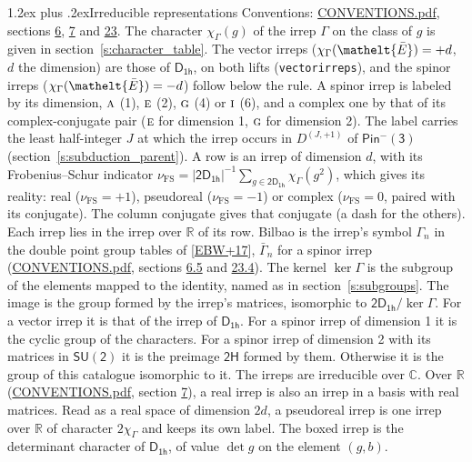 \documentclass[10pt,a4paper]{article}
\makeatletter
\renewcommand\section{\@startsection{section}{1}{\z@}{-3ex plus -1ex minus -.2ex}%
  {1.2ex plus .2ex}{\normalfont\large\sffamily\bfseries\color{parttitle}}}
\numberwithin{equation}{section}
\newcommand{\eltfont}[1]{{\let\sigma\eltsigma\mathelt{#1}}}
\newcommand{\grp}[1]{\mathsf{#1}}
\newcommand{\irr}[1]{\text{\normalfont\scshape #1}}
\newcommand{\elt}[1]{\eltfont{#1}}
\newcommand{\irrJp}[2]{D^{(#1,#2)}}
\newcommand{\irchar}[1]{\chi_{#1}}
\newcommand{\fsind}{\nu_{\mathrm{FS}}}
\newcommand{\barred}[1]{\bar{#1}}
\makeatother
\begin{document}
\section{Irreducible representations}\label{s:irreps}
Conventions: \href{../../CONVENTIONS.pdf}{CONVENTIONS.pdf}, sections \href{../../../rotation/CONVENTIONS.pdf\#conv.6}{6}, \href{../../../rotation/CONVENTIONS.pdf\#conv.7}{7} and \href{../../CONVENTIONS.pdf\#conv.23}{23}.
\leavevmode\label{n:function.character}\label{n:irrep.Gamma}The character $\irchar{\Gamma}(g)$ of the irrep $\Gamma$ on the class of $g$ is given in section~\ref{s:character_table}. \label{n:index.dimension}The vector irreps ($\irchar{\Gamma}(\elt{\barred{E}}) = +d$, $d$ the dimension) are those of \href{../../../rotation/data/pdf/D1h.pdf}{$\grp{D_{1h}}$}, on both lifts (\texttt{vectorirreps}), and the spinor irreps ($\irchar{\Gamma}(\elt{\barred{E}}) = -d$) follow below the rule. A spinor irrep is labeled by its dimension, $\irr{a}$ (1), $\irr{e}$ (2), $\irr{g}$ (4) or $\irr{i}$ (6), and a complex one by that of its complex-conjugate pair ($\irr{e}$ for dimension 1, $\irr{g}$ for dimension 2). The label carries the least half-integer $J$ at which the irrep occurs in $\irrJp{J}{+1}$ of $\grp{Pin^{-}(3)}$ (section~\ref{s:subduction_parent}).
\leavevmode\label{n:index.frobenius}\label{n:head.irrep}\label{n:head.reality}A row is an irrep of dimension $d$, with its Frobenius--Schur indicator $\fsind = |\grp{2D_{1h}}|^{-1}\allowbreak\sum_{g\in\grp{2D_{1h}}}\irchar{\Gamma}(g^2)$, which gives its reality: real ($\fsind = +1$), pseudoreal ($\fsind = -1$) or complex ($\fsind = 0$, paired with its conjugate). \label{n:head.conjugate}The column conjugate gives that conjugate (a dash for the others). \label{n:head.over.real}Each irrep lies in the irrep over $\mathbb{R}$ of its row. \label{n:head.bilbao}\label{n:irrep.alias.gamma}Bilbao is the irrep's symbol $\Gamma_n$ in the double point group tables of [\href{../../../REFERENCES.pdf\#ref.EBW+17}{EBW+17}], $\bar{\Gamma}_n$ for a spinor irrep (\href{../../CONVENTIONS.pdf}{CONVENTIONS.pdf}, sections \href{../../../rotation/CONVENTIONS.pdf\#conv.6.5}{6.5} and \href{../../CONVENTIONS.pdf\#conv.23.4}{23.4}). \label{n:head.kernel}The kernel $\ker\Gamma$ is the subgroup of the elements mapped to the identity, named as in section~\ref{s:subgroups}. \label{n:head.image}The image is the group formed by the irrep's matrices, isomorphic to $\grp{2D_{1h}}/\ker\Gamma$. For a vector irrep it is that of the irrep of \href{../../../rotation/data/pdf/D1h.pdf}{$\grp{D_{1h}}$}. For a spinor irrep of dimension 1 it is the cyclic group of the characters. For a spinor irrep of dimension 2 with its matrices in $\grp{SU(2)}$ it is the preimage $\grp{2H}$ formed by them. Otherwise it is the group of this catalogue isomorphic to it. The irreps are irreducible over $\mathbb{C}$. Over $\mathbb{R}$ (\href{../../CONVENTIONS.pdf}{CONVENTIONS.pdf}, section \href{../../../rotation/CONVENTIONS.pdf\#conv.7}{7}), a real irrep is also an irrep in a basis with real matrices. Read as a real space of dimension $2d$, a pseudoreal irrep is one irrep over $\mathbb{R}$ of character $2\irchar{\Gamma}$ and keeps its own label. \label{n:mark.determinant}The boxed irrep is the determinant character of \href{../../../rotation/data/pdf/D1h.pdf}{$\grp{D_{1h}}$}, of value $\det g$ on the element $(g, b)$.
\end{document}
